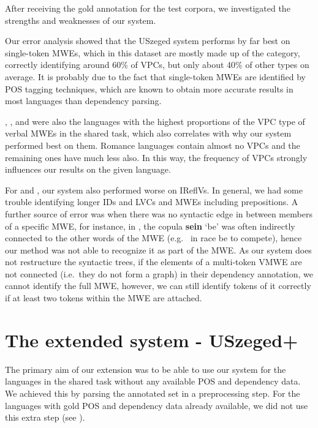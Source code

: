 \documentclass[output=paper,
modfonts,
]{langscibook}
\begin{document}
After receiving the gold annotation for the test corpora, we investigated the strengths and weaknesses of our system. 


Our error analysis showed that the USzeged system performs by far best on single-token MWEs, which in this dataset are mostly made up of the  category, correctly identifying around 60\% of VPCs, but only about 40\% of other types on average. It is probably due to the fact that single-token MWEs are identified by POS tagging techniques, which are known to obtain more accurate results in most languages than dependency parsing.

, , and  were also the languages with the highest proportions of the VPC type of verbal MWEs in the shared task, which also correlates with why our system performed best on them. Romance languages contain almost no VPCs and the remaining ones have much less also. In this way, the frequency of VPCs strongly influences our results on the given language.

For  and , our system also performed worse on IReflVs. In general, we had some trouble identifying longer IDs and LVCs and MWEs including prepositions. A further source of error was when there was no syntactic edge in between members of a specific MWE, for instance, in , the copula \textbf{sein} `be’ was often indirectly connected to the other words of the MWE (e.g.~ {in race be} {to compete}), hence our method was not able to recognize it as part of the MWE. As our system does not restructure the syntactic trees, if the elements of a multi-token VMWE are not connected (i.e.~they do not form a graph) in their dependency annotation, we cannot identify the full MWE, however, we can still identify tokens of it correctly if at least two tokens within the MWE are attached.

\section{The extended system - USzeged+}

The primary aim of our extension was to be able to use our system for the languages in the shared task without any available POS and dependency data. We achieved this by parsing the annotated set in a preprocessing step. For the languages with gold POS and dependency data already available, we did not use this extra step (see ).
\end{document}
